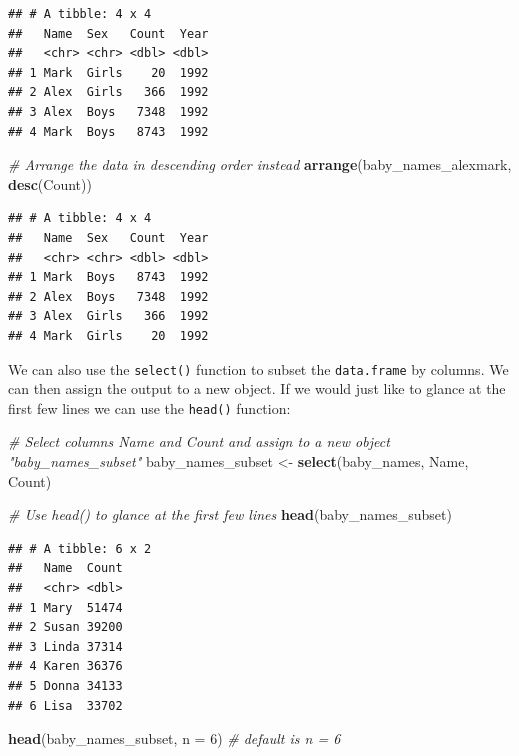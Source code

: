 \documentclass[]{book}
\newenvironment{Shaded}{\begin{snugshade}}{\end{snugshade}}
\newcommand{\CommentTok}[1]{\textcolor[rgb]{0.56,0.35,0.01}{\textit{#1}}}
\newcommand{\DataTypeTok}[1]{\textcolor[rgb]{0.13,0.29,0.53}{#1}}
\newcommand{\DecValTok}[1]{\textcolor[rgb]{0.00,0.00,0.81}{#1}}
\newcommand{\KeywordTok}[1]{\textcolor[rgb]{0.13,0.29,0.53}{\textbf{#1}}}
\newcommand{\NormalTok}[1]{#1}
\newcommand{\StringTok}[1]{\textcolor[rgb]{0.31,0.60,0.02}{#1}}
\begin{document}
\begin{verbatim}
## # A tibble: 4 x 4
##   Name  Sex   Count  Year
##   <chr> <chr> <dbl> <dbl>
## 1 Mark  Girls    20  1992
## 2 Alex  Girls   366  1992
## 3 Alex  Boys   7348  1992
## 4 Mark  Boys   8743  1992
\end{verbatim}

\begin{Shaded}
\begin{Highlighting}[]
\CommentTok{# Arrange the data in descending order instead}
\KeywordTok{arrange}\NormalTok{(baby_names_alexmark, }\KeywordTok{desc}\NormalTok{(Count))}
\end{Highlighting}
\end{Shaded}

\begin{verbatim}
## # A tibble: 4 x 4
##   Name  Sex   Count  Year
##   <chr> <chr> <dbl> <dbl>
## 1 Mark  Boys   8743  1992
## 2 Alex  Boys   7348  1992
## 3 Alex  Girls   366  1992
## 4 Mark  Girls    20  1992
\end{verbatim}

We can also use the \texttt{select()} function to subset the \texttt{data.frame}
by columns. We can then assign the output to a new object. If we
would just like to glance at the first few lines we can use the
\texttt{head()} function:

\begin{Shaded}
\begin{Highlighting}[]
\CommentTok{# Select columns Name and Count and assign to a new object "baby_names_subset"}
\NormalTok{baby_names_subset <-}\StringTok{ }\KeywordTok{select}\NormalTok{(baby_names, Name, Count)}

\CommentTok{# Use head() to glance at the first few lines}
\KeywordTok{head}\NormalTok{(baby_names_subset)}
\end{Highlighting}
\end{Shaded}

\begin{verbatim}
## # A tibble: 6 x 2
##   Name  Count
##   <chr> <dbl>
## 1 Mary  51474
## 2 Susan 39200
## 3 Linda 37314
## 4 Karen 36376
## 5 Donna 34133
## 6 Lisa  33702
\end{verbatim}

\begin{Shaded}
\begin{Highlighting}[]
\KeywordTok{head}\NormalTok{(baby_names_subset, }\DataTypeTok{n =} \DecValTok{6}\NormalTok{) }\CommentTok{# default is n = 6}
\end{Highlighting}
\end{Shaded}
\end{document}
